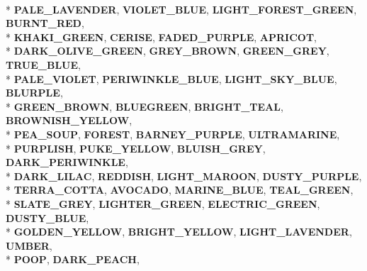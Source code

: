 \begin{DoxyCompactItemize}
\\*
{\bfseries P\+A\+L\+E\+\_\+\+L\+A\+V\+E\+N\+D\+ER}, 
{\bfseries V\+I\+O\+L\+E\+T\+\_\+\+B\+L\+UE}, 
{\bfseries L\+I\+G\+H\+T\+\_\+\+F\+O\+R\+E\+S\+T\+\_\+\+G\+R\+E\+EN}, 
{\bfseries B\+U\+R\+N\+T\+\_\+\+R\+ED}, 
\\*
{\bfseries K\+H\+A\+K\+I\+\_\+\+G\+R\+E\+EN}, 
{\bfseries C\+E\+R\+I\+SE}, 
{\bfseries F\+A\+D\+E\+D\+\_\+\+P\+U\+R\+P\+LE}, 
{\bfseries A\+P\+R\+I\+C\+OT}, 
\\*
{\bfseries D\+A\+R\+K\+\_\+\+O\+L\+I\+V\+E\+\_\+\+G\+R\+E\+EN}, 
{\bfseries G\+R\+E\+Y\+\_\+\+B\+R\+O\+WN}, 
{\bfseries G\+R\+E\+E\+N\+\_\+\+G\+R\+EY}, 
{\bfseries T\+R\+U\+E\+\_\+\+B\+L\+UE}, 
\\*
{\bfseries P\+A\+L\+E\+\_\+\+V\+I\+O\+L\+ET}, 
{\bfseries P\+E\+R\+I\+W\+I\+N\+K\+L\+E\+\_\+\+B\+L\+UE}, 
{\bfseries L\+I\+G\+H\+T\+\_\+\+S\+K\+Y\+\_\+\+B\+L\+UE}, 
{\bfseries B\+L\+U\+R\+P\+LE}, 
\\*
{\bfseries G\+R\+E\+E\+N\+\_\+\+B\+R\+O\+WN}, 
{\bfseries B\+L\+U\+E\+G\+R\+E\+EN}, 
{\bfseries B\+R\+I\+G\+H\+T\+\_\+\+T\+E\+AL}, 
{\bfseries B\+R\+O\+W\+N\+I\+S\+H\+\_\+\+Y\+E\+L\+L\+OW}, 
\\*
{\bfseries P\+E\+A\+\_\+\+S\+O\+UP}, 
{\bfseries F\+O\+R\+E\+ST}, 
{\bfseries B\+A\+R\+N\+E\+Y\+\_\+\+P\+U\+R\+P\+LE}, 
{\bfseries U\+L\+T\+R\+A\+M\+A\+R\+I\+NE}, 
\\*
{\bfseries P\+U\+R\+P\+L\+I\+SH}, 
{\bfseries P\+U\+K\+E\+\_\+\+Y\+E\+L\+L\+OW}, 
{\bfseries B\+L\+U\+I\+S\+H\+\_\+\+G\+R\+EY}, 
{\bfseries D\+A\+R\+K\+\_\+\+P\+E\+R\+I\+W\+I\+N\+K\+LE}, 
\\*
{\bfseries D\+A\+R\+K\+\_\+\+L\+I\+L\+AC}, 
{\bfseries R\+E\+D\+D\+I\+SH}, 
{\bfseries L\+I\+G\+H\+T\+\_\+\+M\+A\+R\+O\+ON}, 
{\bfseries D\+U\+S\+T\+Y\+\_\+\+P\+U\+R\+P\+LE}, 
\\*
{\bfseries T\+E\+R\+R\+A\+\_\+\+C\+O\+T\+TA}, 
{\bfseries A\+V\+O\+C\+A\+DO}, 
{\bfseries M\+A\+R\+I\+N\+E\+\_\+\+B\+L\+UE}, 
{\bfseries T\+E\+A\+L\+\_\+\+G\+R\+E\+EN}, 
\\*
{\bfseries S\+L\+A\+T\+E\+\_\+\+G\+R\+EY}, 
{\bfseries L\+I\+G\+H\+T\+E\+R\+\_\+\+G\+R\+E\+EN}, 
{\bfseries E\+L\+E\+C\+T\+R\+I\+C\+\_\+\+G\+R\+E\+EN}, 
{\bfseries D\+U\+S\+T\+Y\+\_\+\+B\+L\+UE}, 
\\*
{\bfseries G\+O\+L\+D\+E\+N\+\_\+\+Y\+E\+L\+L\+OW}, 
{\bfseries B\+R\+I\+G\+H\+T\+\_\+\+Y\+E\+L\+L\+OW}, 
{\bfseries L\+I\+G\+H\+T\+\_\+\+L\+A\+V\+E\+N\+D\+ER}, 
{\bfseries U\+M\+B\+ER}, 
\\*
{\bfseries P\+O\+OP}, 
{\bfseries D\+A\+R\+K\+\_\+\+P\+E\+A\+CH}, 

\end{DoxyCompactItemize}
